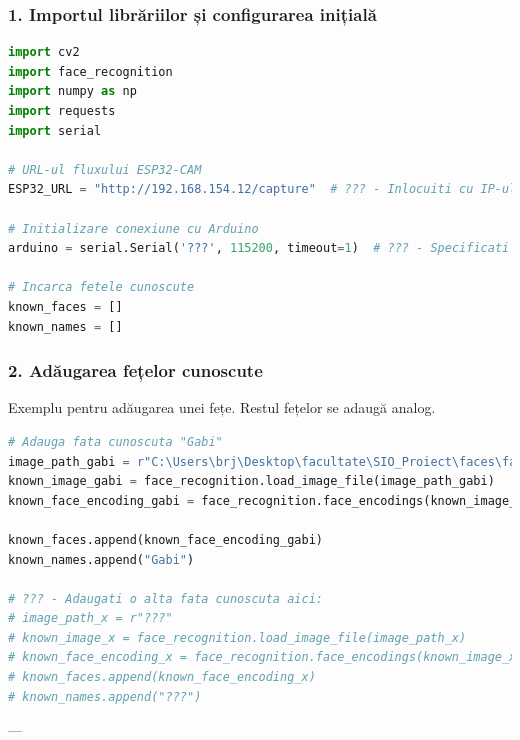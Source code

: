 \documentclass{report}
\begin{document}
\subsubsection{1. Importul librăriilor și configurarea inițială}
\begin{lstlisting}[language=Python]
import cv2
import face_recognition
import numpy as np
import requests
import serial

# URL-ul fluxului ESP32-CAM
ESP32_URL = "http://192.168.154.12/capture"  # ??? - Inlocuiti cu IP-ul ESP32-CAM

# Initializare conexiune cu Arduino
arduino = serial.Serial('???', 115200, timeout=1)  # ??? - Specificati portul serial Arduino

# Incarca fetele cunoscute
known_faces = []
known_names = []
\end{lstlisting}
\newpage
\vspace*{1cm}
\subsubsection{2. Adăugarea fețelor cunoscute}
Exemplu pentru adăugarea unei fețe. Restul fețelor se adaugă analog.
\begin{lstlisting}[language=Python]
# Adauga fata cunoscuta "Gabi"
image_path_gabi = r"C:\Users\brj\Desktop\facultate\SIO_Proiect\faces\face1.jpg"
known_image_gabi = face_recognition.load_image_file(image_path_gabi)
known_face_encoding_gabi = face_recognition.face_encodings(known_image_gabi)[0]

known_faces.append(known_face_encoding_gabi)
known_names.append("Gabi")

# ??? - Adaugati o alta fata cunoscuta aici:
# image_path_x = r"???"
# known_image_x = face_recognition.load_image_file(image_path_x)
# known_face_encoding_x = face_recognition.face_encodings(known_image_x)[0]
# known_faces.append(known_face_encoding_x)
# known_names.append("???")
\end{lstlisting}

---
\end{document}
